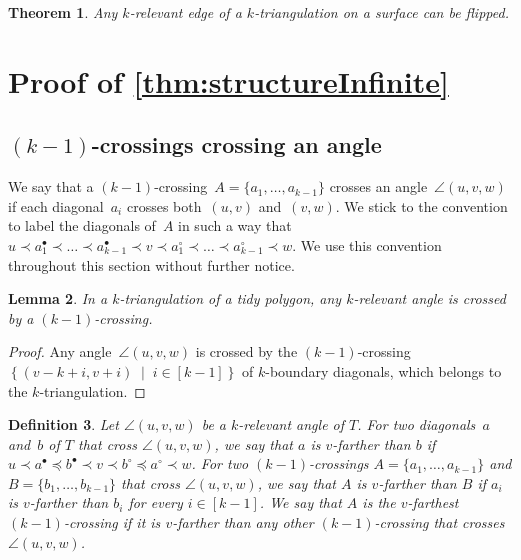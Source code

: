 \documentclass{amsart}
\newtheorem{theorem}{Theorem}[section]
\newtheorem{lemma}[theorem]{Lemma}
\newtheorem{definition}[theorem]{Definition}
\theoremstyle{remark}
\newcommand{\darkblue}{\color{darkblue}} %
\newcommand{\defn}[1]{\textsl{\darkblue #1}} %
\newcommand{\set}[2]{\left\{ #1 \;\middle|\; #2 \right\}} %
\newcommand*{\ktg}[0]{$k$-triangulation\xspace}
\newcommand{\cl}{\prec}
\newcommand{\cle}{\preccurlyeq}
\begin{document}
\begin{theorem}
\label{generalFlip}
Any $k$-relevant edge of a $k$-triangulation on a surface can be flipped.
\end{theorem}


\section{Proof of \cref{thm:structureInfinite}}
\label{sec:prfInfinite}


\subsection{$(k-1)$-crossings crossing an angle}

We say that a $(k-1)$-crossing~$A = \{a_1, \dots, a_{k-1}\}$ crosses an angle~$\angle(u,v,w)$ if each diagonal~$a_i$ crosses both~$(u,v)$ and~$(v,w)$. We stick to the convention to label the diagonals of~$A$ in such a way that $u \cl a^\bullet_1 \cl \dots \cl a^\bullet_{k-1} \cl v \cl a^\circ_1 \cl \dots \cl a^\circ_{k-1} \cl w$. We use this convention throughout this section without further notice.

\begin{lemma}
\label{lem:tidyExists}
In a \ktg of a tidy polygon, any $k$-relevant angle is crossed by a $(k-1)$-crossing.
\end{lemma}

\begin{proof}
Any angle~$\angle(u,v,w)$ is crossed by the $(k-1)$-crossing~$\set{(v-k+i, v+i)}{i \in [k-1]}$ of $k$-boundary diagonals, which belongs to the \ktg.
\end{proof}

\begin{definition}
Let $\angle(u,v,w)$ be a $k$-relevant angle of $T$.
For two diagonals~$a$ and~$b$ of $T$ that cross $\angle(u,v,w)$, we say that $a$ is \defn{$v$-farther} than $b$ if $u \cl a^\bullet \cle b^\bullet \cl v \cl b^\circ \cle a^\circ \cl w$. For two $(k-1)$-crossings $A = \{a_1, \dots, a_{k-1}\}$ and $B = \{b_1, \dots, b_{k-1}\}$ that cross $\angle(u,v,w)$, we say that $A$ is \defn{$v$-farther} than $B$ if $a_i$ is $v$-farther than $b_i$ for every $i \in [k-1]$. We say that $A$ is the \defn{$v$-farthest} $(k-1)$-crossing if it is $v$-farther than any other $(k-1)$-crossing that crosses~$\angle(u,v,w)$.
\end{definition}
\end{document}
